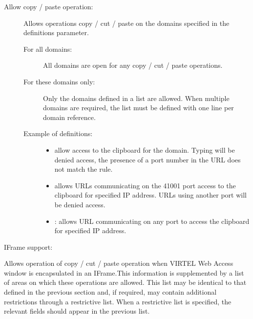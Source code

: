 \documentclass[letterpaper,10pt,english]{sphinxmanual}
\begin{document}

\begin{description}
\item[{Allow copy / paste operation:}] \leavevmode
Allows operations copy / cut / paste on the domains specified in the definitions parameter.
\begin{description}
\item[{For all domains:}] \leavevmode
All domains are open for any copy / cut / paste operations.

\item[{For these domains only:}] \leavevmode
Only the domains defined in a list are allowed. When multiple domains are required, the list must be defined with one line per domain reference.

\item[{Example of definitions:}] \leavevmode\begin{itemize}
\item {} 
 allow access to the clipboard for the domain. Typing  will be denied access, the presence of a port number in the URL does not match the rule.

\item {} 
 allows URLs communicating on the 41001 port access to the clipboard for specified IP address. URLs using another port will be denied access.

\item {} 
:\sphinxstyleemphasis{/} allows URL communicating on any port to access the clipboard for specified IP address.

\end{itemize}

\end{description}

\end{description}

IFrame support:

Allows operation of copy / cut / paste operation when VIRTEL Web Access window is encapsulated in an IFrame.This
information is supplemented by a list of areas on which these operations are allowed. This list may be identical to
that defined in the previous section and, if required, may contain additional restrictions through a restrictive list.
When a restrictive list is specified, the relevant fields should appear in the previous list.
\end{document}
